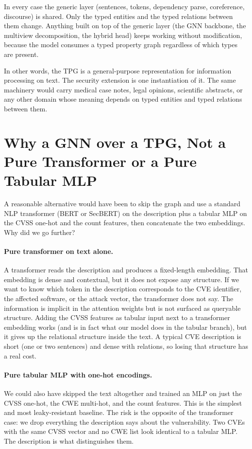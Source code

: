 \documentclass[11pt]{article}
\begin{document}
In every case the generic layer (sentences, tokens, dependency parse,
coreference, discourse) is shared. Only the typed entities and the
typed relations between them change. Anything built on top of the
generic layer (the GNN backbone, the multiview decomposition, the
hybrid head) keeps working without modification, because the model
consumes a typed property graph regardless of which types are present.

In other words, the TPG is a general-purpose representation for
information processing on text. The security extension is one
instantiation of it. The same machinery would carry medical case
notes, legal opinions, scientific abstracts, or any other domain whose
meaning depends on typed entities and typed relations between them.

\section{Why a GNN over a TPG, Not a Pure Transformer or a Pure Tabular MLP}

A reasonable alternative would have been to skip the graph and use a
standard NLP transformer (BERT or SecBERT) on the description plus a
tabular MLP on the CVSS one-hot and the count features, then
concatenate the two embeddings. Why did we go further?

\paragraph{Pure transformer on text alone.}
A transformer reads the description and produces a fixed-length
embedding. That embedding is dense and contextual, but it does not
expose any structure. If we want to know which token in the
description corresponds to the CVE identifier, the affected software,
or the attack vector, the transformer does not say. The information
is implicit in the attention weights but is not surfaced as queryable
structure. Adding the CVSS features as tabular input next to a
transformer embedding works (and is in fact what our model does in
the tabular branch), but it gives up the relational structure inside
the text. A typical CVE
description is short (one or two sentences) and dense with relations,
so losing that structure has a real cost.

\paragraph{Pure tabular MLP with one-hot encodings.}
We could also have skipped the text altogether and trained an MLP on
just the CVSS one-hot, the CWE multi-hot, and the count features. This
is the simplest and most leaky-resistant baseline. The risk is the
opposite of the transformer case: we drop everything the description
says about the vulnerability. Two CVEs with the same CVSS vector and
no CWE list look identical to a tabular MLP. The description is what
distinguishes them.
\end{document}
